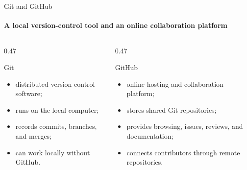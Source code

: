 \begin{frame}{Git and GitHub}
\framesubtitle{A local version-control tool and an online collaboration platform}
\footnotesize
\begin{columns}[T,onlytextwidth]
\begin{column}{0.47\textwidth}
\begin{block}{Git}
\begin{itemize}\setlength{\itemsep}{0.18em}
\item distributed version-control software;
\item runs on the local computer;
\item records commits, branches, and merges;
\item can work locally without GitHub.
\end{itemize}
\end{block}
\end{column}
\begin{column}{0.47\textwidth}
\begin{exampleblock}{GitHub}
\begin{itemize}\setlength{\itemsep}{0.18em}
\item online hosting and collaboration platform;
\item stores shared Git repositories;
\item provides browsing, issues, reviews, and documentation;
\item connects contributors through remote repositories.
\end{itemize}
\end{exampleblock}
\end{column}
\end{columns}
\end{frame}



